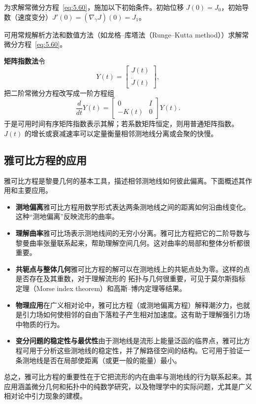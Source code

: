 为求解常微分方程~\eqref{eq:5.60}，施加以下初始条件。初始位移 $J(0)=J_0$，初始导数（速度变分）$J'(0)=(\nabla_{\dot\gamma}J)(0)=J_1$。

可用常规解析方法和数值方法（如龙格–库塔法（Runge–Kutta method））求解常微分方程~\eqref{eq:5.60}。

\textbf{矩阵指数法}\quad 令
\[
  Y(t)=\begin{bmatrix}J(t)\\\dot J(t)\end{bmatrix},
\]
把二阶常微分方程改写成一阶方程组
\[
  \frac{d}{dt}Y(t)=
  \begin{bmatrix}0&I\\-K(t)&0\end{bmatrix}Y(t).
\]
于是可用时间有序矩阵指数表示其解；若系数矩阵恒定，则用普通矩阵指数。$J(t)$ 的增长或衰减速率可以定量衡量相邻测地线分离或会聚的快慢。

\subsection{雅可比方程的应用}
雅可比方程是黎曼几何的基本工具，描述相邻测地线如何彼此偏离。下面概述其作用和主要应用。
\begin{itemize}
  \item \textbf{测地偏离}\quad 雅可比方程用数学形式表达两条测地线之间的距离如何沿曲线变化。这种“测地偏离”反映流形的曲率。
  \item \textbf{理解曲率}\quad 雅可比场表示测地线间的无穷小分离。雅可比方程把它的二阶导数与黎曼曲率张量联系起来，帮助理解空间几何。这对曲率的局部和整体分析都很重要。
  \item \textbf{共轭点与整体几何}\quad 雅可比方程的解可以在测地线上的共轭点处为零。这样的点是否存在及其重数，对于理解流形的
  拓扑与几何很重要，可见于莫尔斯指标定理（Morse index theorem）和高斯–博内定理等结果。
  \item \textbf{物理应用}\quad 在广义相对论中，雅可比方程（或测地偏离方程）解释潮汐力，也就是引力场如何使相邻的自由下落粒子产生相对加速度。这有助于理解强引力场中物质的行为。
  \item \textbf{变分问题的稳定性与最优性}\quad 由于测地线是流形上能量泛函的临界点，雅可比方程可用于分析这些测地线的稳定性，并了解路径空间的结构。它可用于验证一条测地线是否在局部使距离（或更一般的能量）最小。
\end{itemize}
总之，雅可比方程的重要性在于它把流形的内在曲率与测地线的行为联系起来。其应用涵盖微分几何和拓扑中的纯数学研究，以及物理学中的实际问题，尤其是广义相对论中引力现象的建模。

